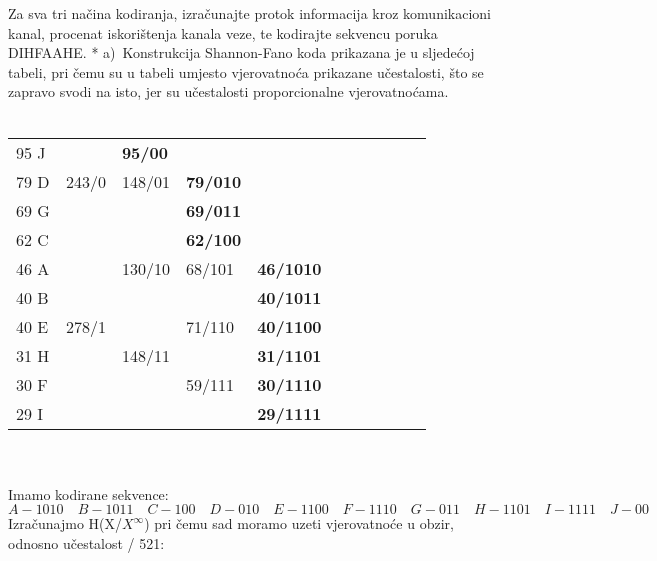 \documentclass[12pt]{article}
\begin{document}
\begin{enumerate}
Za sva tri načina kodiranja, izračunajte protok informacija kroz komunikacioni kanal, procenat iskorištenja kanala veze, te kodirajte sekvencu poruka DIHFAAHE.
		\newpage
		* a)~Konstrukcija Shannon-Fano koda prikazana je u sljedećoj tabeli, pri
čemu su u tabeli umjesto vjerovatnoća prikazane učestalosti, što se
zapravo svodi na isto, jer su učestalosti proporcionalne vjerovatnoćama. \\
\\
\begin{tabular}{|l|l|l|llllllll}
\cline{1-3}
95 J &       & \textbf{95/00} &                                      &                                       &  &  &  &  &  &  \\ \cline{1-1} \cline{3-4}
79 D & 243/0 & 148/01         & \multicolumn{1}{l|}{\textbf{79/010}} &                                       &  &  &  &  &  &  \\ \cline{1-1} \cline{4-4}
69 G &       &                & \multicolumn{1}{l|}{\textbf{69/011}} &                                       &  &  &  &  &  &  \\ \cline{1-4}
62 C &       &                & \multicolumn{1}{l|}{\textbf{62/100}} &                                       &  &  &  &  &  &  \\ \cline{1-1} \cline{4-5}
46 A &       & 130/10         & \multicolumn{1}{l|}{68/101}          & \multicolumn{1}{l|}{\textbf{46/1010}} &  &  &  &  &  &  \\ \cline{1-1} \cline{5-5}
40 B &       &                & \multicolumn{1}{l|}{}                & \multicolumn{1}{l|}{\textbf{40/1011}} &  &  &  &  &  &  \\ \cline{1-1} \cline{3-5}
40 E & 278/1 &                & \multicolumn{1}{l|}{71/110}          & \multicolumn{1}{l|}{\textbf{40/1100}} &  &  &  &  &  &  \\ \cline{1-1} \cline{5-5}
31 H &       & 148/11         & \multicolumn{1}{l|}{}                & \multicolumn{1}{l|}{\textbf{31/1101}} &  &  &  &  &  &  \\ \cline{1-1} \cline{4-5}
30 F &       &                & \multicolumn{1}{l|}{59/111}          & \multicolumn{1}{l|}{\textbf{30/1110}} &  &  &  &  &  &  \\ \cline{1-1} \cline{5-5}
29 I &       &                & \multicolumn{1}{l|}{}                & \multicolumn{1}{l|}{\textbf{29/1111}} &  &  &  &  &  &  \\ \cline{1-5}
\end{tabular}
\\
\\
Imamo kodirane sekvence:
\begin{equation*}
    A - 1010 \quad B - 1011 \quad C - 100 \quad D - 010 \quad E - 1100 \quad F - 1110 \quad G - 011 \quad H - 1101 \quad I - 1111 \quad J - 00
\end{equation*}
Izračunajmo H(X/${X^\infty}$) pri čemu sad moramo uzeti vjerovatnoće u obzir, \\odnosno  učestalost / 521:
		

\end{enumerate}
\end{document}
